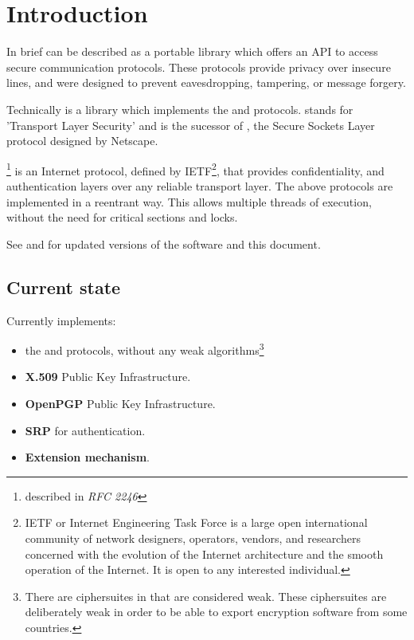 \section{Introduction}

\par
In brief \gnutls{} can be described as a portable library which offers
an API to access secure communication protocols. These protocols provide
privacy over insecure lines, and were designed to prevent 
eavesdropping, tampering, or message forgery.

\par
Technically \gnutls{} is a library which implements the \tlsI{} and 
\sslIII{} protocols.
\tls{} stands for 'Transport Layer Security' and is the sucessor of \ssl{}, 
the Secure Sockets Layer protocol designed by Netscape. 

\tlsI{}\footnote{described in {\it RFC 2246}} is an Internet protocol,
defined by {IETF}\footnote{IETF or Internet Engineering Task Force 
is a large open international community of network
designers, operators, vendors, and researchers concerned with the evolution of 
the Internet architecture and the smooth operation of the Internet. It is open to any interested individual.}, 
that provides confidentiality, and authentication layers over any reliable
transport layer.
The above protocols are implemented in a reentrant way. 
This allows multiple threads of execution, without the need for critical 
sections and locks. 

\par
See 
and  
for updated versions of the \gnutls{} software and this document.

\subsection{Current state}

Currently \gnutls{} implements:
\begin{itemize}
\item the \tlsI{} and \sslIII{} protocols, without any weak algorithms\footnote{
There are ciphersuites in \tlsI{} that are considered weak. These
ciphersuites are deliberately weak in order to be able to export encryption
software from some countries.}
\item {\bf X.509} Public Key Infrastructure.
\item {\bf OpenPGP} Public Key Infrastructure.
\item {\bf SRP} for \tls{} authentication.
\item \tls{} {\bf Extension mechanism}.
\end{itemize}

